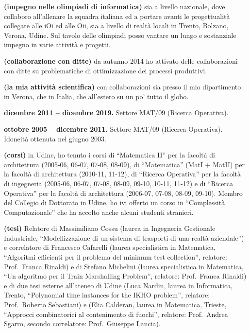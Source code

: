 \indent
{\bf (impegno nelle olimpiadi di informatica)}
sia a livello nazionale, dove collaboro all'allenare la squadra italiana
ed a portare avanti le progettualit\`a collegate alle iOi ed alle Oii,
sia a livello di realt\`a locali in Trento, Bolzano, Verona, Udine.
Sul tavolo delle olimpiadi posso vantare un lungo e sostanziale impegno in varie attivit\`a e progetti. 

{\bf (collaborazione con ditte)}
da autunno 2014 ho attivato delle collaborazioni con ditte
su problematiche di ottimizzazione dei processi produttivi.

{\bf (la mia attivit\`a scientifica)}
con collaborazioni sia presso il mio dipartimento in Verona, che in Italia, che all'estero su un po' tutto il globo.


\vspace{1.8mm}


{\bf dicembre 2011 -- dicembre 2019.}
Settore MAT/09 (Ricerca Operativa).

{\bf ottobre 2005 -- dicembre 2011.}
Settore MAT/09 (Ricerca Operativa).
Idoneit\`a ottenuta nel giugno 2003.

{\bf (corsi)} in Udine,
ho tenuto i corsi di ``Matematica II''
per la facolt\`a di architettura
(2005-06, 06-07, 07-08, 08-09),
di ``Matematica'' (MatI + MatII)
per la facolt\`a di architettura (2010-11, 11-12),
di ``Ricerca Operativa''
per la facolt\`a di ingegneria
(2005-06, 06-07, 07-08, 08-09, 09-10, 10-11, 11-12)
e di ``Ricerca Operativa''
per la facolt\`a di architettura
(2006-07, 07-08, 08-09, 09-10).
Membro del Collegio di Dottorato in Udine,
ho ivi offerto un corso in ``Complessit\`a Computazionale''
che ha accolto anche alcuni studenti stranieri.

{\bf (tesi)} Relatore di Massimiliano Cossu
(laurea in Ingegneria Gestionale Industriale,
``Modellizzazione di un sistema di trasporti di una realt\`a aziendale'')
e correlatore di Francesco Cafarelli
(laurea specialistica in Matematica,
``Algoritmi efficienti per il problema del minimum test collection'',
relatore: Prof.~Franca Rinaldi)
e di Stefano Michelini (laurea specialistica in Matematica, ``Un algoritmo per il Train Marshalling Problem'', relatore: Prof.~Franca Rinaldi) %
e di due tesi esterne all'ateneo di Udine
(Luca Nardin, laurea in Informatica, Trento,%
``Polynomial time instances for the IKHO problem'',
relatore: Prof.~Roberto Sebastiani)
e (Elia Calderan, laurea in Matematica, Trieste,%
``Approcci combinatorici al contenimento di fuochi'',
relatore: Prof.~Andrea Sgarro,
secondo correlatore: Prof.~Giuseppe Lancia).

